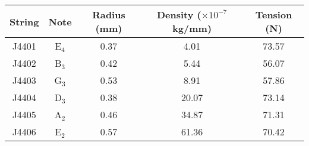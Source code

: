 \begin{tabular}{ccccc}
\toprule
String &    Note &  Radius (mm) &  Density ($\times 10^{-7}$ kg/mm) &  Tension (N) \\
\midrule
 J4401 & E$_{4}$ &         0.37 &                              4.01 &        73.57 \\
 J4402 & B$_{3}$ &         0.42 &                              5.44 &        56.07 \\
 J4403 & G$_{3}$ &         0.53 &                              8.91 &        57.86 \\
 J4404 & D$_{3}$ &         0.38 &                             20.07 &        73.14 \\
 J4405 & A$_{2}$ &         0.46 &                             34.87 &        71.31 \\
 J4406 & E$_{2}$ &         0.57 &                             61.36 &        70.42 \\
\bottomrule
\end{tabular}

